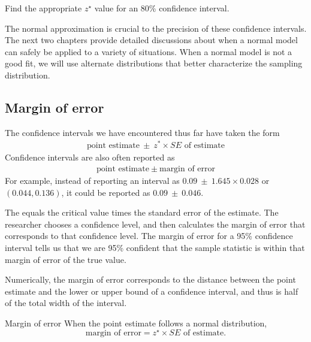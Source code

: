 \begin{exercisewrap}
\begin{nexercise} \label{find90CIForRun10AgeExercise}
Find the appropriate $z^{\star}$ value for an 80\% confidence interval.\footnotemark
\end{nexercise}
\end{exercisewrap}

The normal approximation is crucial to the precision of these confidence intervals. The next two chapters provide detailed discussions about when a normal model can safely be applied to a variety of situations. When a normal model is not a good fit, we will use alternate distributions that better characterize the sampling distribution.

\D{\newpage}

\subsection{Margin of error}

The confidence intervals we have encountered thus far have taken the form
\begin{align*}
\text{point estimate} \ \pm \ z^*\times SE \text{ of estimate}
\end{align*}
Confidence intervals are also often reported as 
\begin{align*}
\text{point estimate} \ \pm \ \text{margin of error}
\end{align*}
For example, instead of reporting an interval as $0.09 \ \pm  \ 1.645\times 0.028$ or $(0.044, 0.136)$, it could be reported as $0.09 \ \pm \  0.046$.

The  equals the critical value times the standard error of the estimate. The researcher chooses a confidence level, and then calculates the margin of error that corresponds to that confidence level.  The margin of error for a 95\% confidence interval tells us that we are 95\% confident that the sample statistic is within that margin of error of the true value.  

Numerically, the margin of error corresponds to the distance between the point estimate and the lower or upper bound of a confidence interval, and thus is half of the total width of the interval.   

\begin{onebox}{Margin of error}\label{marginOfErrorTermBox}
When the point estimate follows a normal distribution, 
$$ \text{margin of error} = z^{\star}\times SE \text{ of estimate}.$$
\end{onebox}


